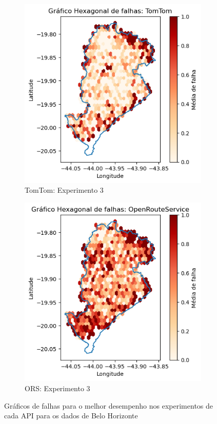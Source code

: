 \begin{figure}[ht]
  \begin{subfigure}[b]{0.45\textwidth}
    \includegraphics[width=\textwidth]{Figuras/falhasTomtomBHexpG.png}
    \caption{TomTom: Experimento 3}
    \label{fig:falhastomtomBexp}
  \end{subfigure}
  \hfill
  \begin{subfigure}[b]{0.45\textwidth}
    \includegraphics[width=\textwidth]{Figuras/falhasOrsBHexpG.png}
    \caption{ORS: Experimento 3}
    \label{fig:falhasorsBexp}
  \end{subfigure}
  
  \caption{Gráficos de falhas para o melhor desempenho nos experimentos de cada API para os dados de Belo Horizonte}
  \label{fig:falhas-global-bh-exp}
\end{figure}

